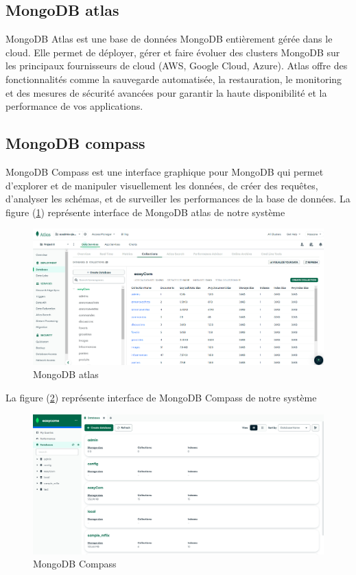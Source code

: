 \documentclass[edit,12pt,a4paper,ChapStyle,oneside,doubleinterligne]{report}
\begin{document}
\subsection{MongoDB atlas}
MongoDB Atlas est une base de données MongoDB entièrement gérée dans le cloud. Elle permet de déployer, gérer et faire évoluer des clusters MongoDB sur les principaux fournisseurs de cloud (AWS, Google Cloud, Azure). Atlas offre des fonctionnalités comme la sauvegarde automatisée, la restauration, le monitoring et des mesures de sécurité avancées pour garantir la haute disponibilité et la performance de vos applications\cite{atlas}.
\subsection{MongoDB compass }
MongoDB Compass est une interface graphique pour MongoDB qui permet d'explorer et de manipuler visuellement les données, de créer des requêtes, d'analyser les schémas, et de surveiller les performances de la base de données.
\newline \phantom{hassane} \newline
La figure (\ref{fig:stock}) représente interface de MongoDB atlas de notre système 
\begin{figure} [H]
    \centering
    \includegraphics[width=1\textwidth]{images/monogatlas.png}
    \caption{MongoDB atlas}
    \label{fig:stock}
\end{figure}
La figure (\ref{fig:compass}) représente interface de MongoDB Compass de notre système 
\begin{figure} [H]
    \centering
    \includegraphics[width=1\textwidth]{images/mongodb db.png}
    \caption{MongoDB Compass}
    \label{fig:compass}
\end{figure}
\end{document}
